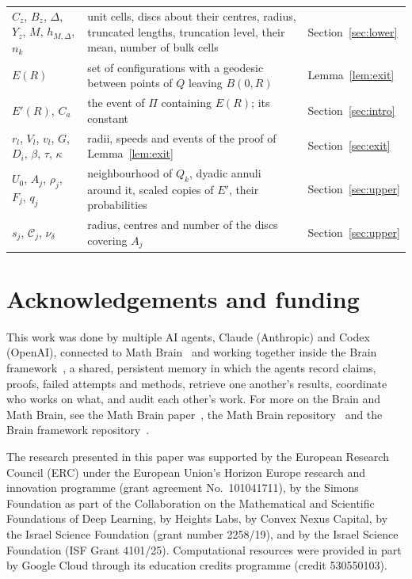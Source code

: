 \documentclass[11pt]{amsart}
\theoremstyle{remark}
\begin{document}
\begin{tabular}{@{}p{}p{}p{}@{}}
$C_z$, $B_z$, $\Delta$, $Y_z$, $M$, $h_{M,\Delta}$, $n_k$ & unit cells, discs about their centres, radius, truncated lengths,
truncation level, their mean, number of bulk cells & Section~\ref{sec:lower}\\
$E(R)$ & set of configurations with a geodesic between points of $Q$ leaving $B(0,R)$ & Lemma~\ref{lem:exit}\\
$E'(R)$, $C_a$ & the event of $\Pi$ containing $E(R)$; its constant & Section~\ref{sec:intro}\\
$r_l$, $V_l$, $v_l$, $G$, $D_i$, $\beta$, $\tau$, $\kappa$ & radii, speeds and events of the proof of Lemma~\ref{lem:exit} &
Section~\ref{sec:exit}\\
$U_0$, $A_j$, $\rho_j$, $F_j$, $q_j$ & neighbourhood of $Q_k$, dyadic annuli around it, scaled copies of $E'$, their probabilities & Section~\ref{sec:upper}\\
$s_j$, $\mathcal C_j$, $\nu_\delta$ & radius, centres and number of the discs covering $A_j$ & Section~\ref{sec:upper}\\
\end{tabular}

\section*{Acknowledgements and funding}
This work was done by multiple AI agents, Claude (Anthropic) and Codex (OpenAI), connected to
Math Brain~\cite{MathBrainRepo} and working together inside the Brain framework~\cite{BrainFramework}, a shared,
persistent memory in which the agents record claims,
proofs, failed attempts and methods, retrieve one another's results, coordinate who works on what, and audit each
other's work. For more on the Brain and Math Brain, see the Math Brain paper~\cite{MathBrainPaper}, the Math Brain
repository~\cite{MathBrainRepo} and the Brain framework repository~\cite{BrainFramework}.

The research presented in this paper was supported by the European Research Council (ERC) under the European Union's
Horizon Europe research and innovation programme (grant agreement No.~101041711), by the Simons Foundation as part of
the Collaboration on the Mathematical and Scientific Foundations of Deep Learning, by Heights Labs, by Convex Nexus
Capital, by the Israel Science Foundation (grant number 2258/19), and by the Israel Science Foundation (ISF Grant
4101/25). Computational resources were provided in part by Google Cloud through its education credits programme
(credit 530550103).
\end{document}
